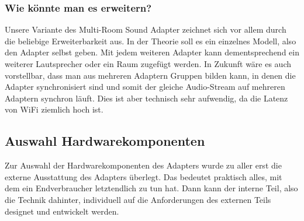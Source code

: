 \documentclass[]{article}
\begin{document}
\subsubsection{Wie könnte man es erweitern?}
Unsere Variante des Multi-Room Sound Adapter zeichnet sich vor allem durch die beliebige Erweiterbarkeit aus. In der Theorie soll es ein einzelnes Modell, also den Adapter selbst geben. Mit jedem weiteren Adapter kann dementsprechend ein weiterer Lautsprecher oder ein Raum zugefügt werden. In Zukunft wäre es auch vorstellbar, dass man aus mehreren Adaptern Gruppen bilden kann, in denen die Adapter synchronisiert sind und somit der gleiche Audio-Stream auf mehreren Adaptern synchron läuft. Dies ist aber technisch sehr aufwendig, da die Latenz von WiFi ziemlich hoch ist.
\subsection{Auswahl Hardwarekomponenten}
Zur Auswahl der Hardwarekomponenten des Adapters wurde zu aller erst die externe Ausstattung des Adapters überlegt. Das bedeutet praktisch alles, mit dem ein Endverbraucher letztendlich zu tun hat. Dann kann der interne Teil, also die Technik dahinter, individuell auf die Anforderungen des externen Teils designet und entwickelt werden.
\end{document}
